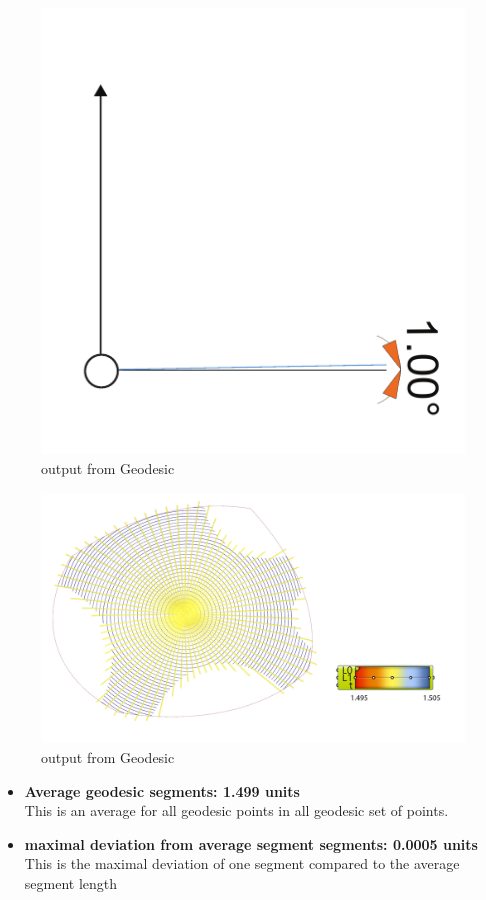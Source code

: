 \begin{figure}[H]
\centering
\includegraphics[width=0.6\linewidth ]{figure/Results/angle.pdf}
\caption{output from Geodesic}
\end{figure}


\begin{figure}[H]
\centering
\includegraphics[width=1.0\linewidth ]{figure/Results/langthsgrad.jpg}
\caption{output from Geodesic}
\end{figure}


\begin{itemize}
    
    \item \textbf{Average geodesic segments: 1.499 units }\\
    This is an average for all geodesic points in all geodesic set of points.
    \item \textbf{maximal deviation from average segment segments:  0.0005 units }\\
    This is the maximal deviation of one segment compared to the average segment length
   

  
\end{itemize}







